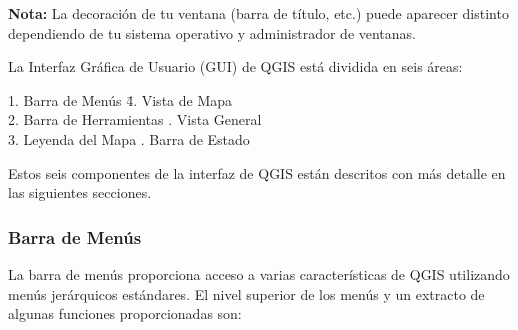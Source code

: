 \textbf{Nota:} La decoración de tu ventana (barra de título, etc.) puede aparecer 
distinto dependiendo de tu sistema operativo y administrador de ventanas.

La Interfaz Gráfica de Usuario (GUI) de QGIS está dividida en seis áreas:

\begin{tabbing}
1. Barra de Menús \hspace{3cm}\= 4. Vista de Mapa \\
2. Barra de Herramientas \hspace{3cm}. Vista General  \\
3. Leyenda del Mapa \hspace{3cm}. Barra de Estado   
\end{tabbing}

Estos seis componentes de la interfaz de QGIS están descritos con más detalle
en las siguientes secciones.

\subsubsection{Barra de Menús}\label{label_menubar}

La barra de menús proporciona acceso a varias características de QGIS utilizando 
menús jerárquicos estándares. El nivel superior de los menús y un extracto de 
algunas funciones proporcionadas son:

